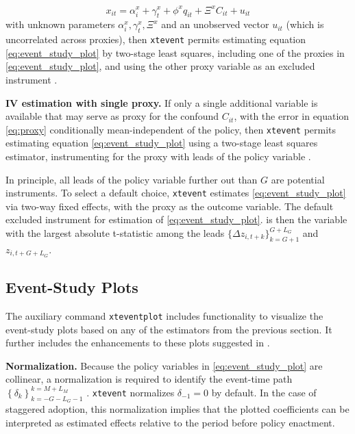 \documentclass[12pt]{article}
\begin{document}
\begin{equation}\label{eq:proxy}
x_{it} = \alpha_i^x + \gamma_t^x + \phi^x q_{it} + \Xi^x C_{it} + u_{it}
\end{equation}
with unknown parameters $\alpha_i^x, \gamma_t^x, \Xi^x$ and an unobserved vector $u_{it}$ (which is uncorrelated across proxies), then \texttt{xtevent} permits estimating equation \eqref{eq:event_study_plot} by two-stage least squares, including one of the proxies in \eqref{eq:event_study_plot}, and using the other proxy variable as an excluded instrument \label{newcite_proxy} \citep{freyaldenhoven2019pre}.

\noindent \textbf{IV estimation with single proxy.}
If only a single additional variable is available that may serve as proxy for the confound $C_{it}$, with the error in equation \eqref{eq:proxy} conditionally mean-independent of the policy, then \texttt{xtevent} permits estimating equation \eqref{eq:event_study_plot} using a two-stage least squares estimator, instrumenting for the proxy with leads of the policy variable \citep{freyaldenhoven2019pre}.

In principle, all leads of the policy variable further out than $G$ are potential instruments.
To select a default choice, \texttt{xtevent} estimates \eqref{eq:event_study_plot} via two-way fixed effects, with the proxy as the outcome variable.
The default excluded instrument for estimation of \eqref{eq:event_study_plot}. is then the variable with the largest absolute t-statistic among the leads $\{\Delta z_{i,t+k}\}_{k=G+1}^{G+L_G}$ and $z_{i,t+G+L_G}$.

\subsection{Event-Study Plots}
\label{subsec:plots}

The auxiliary command \texttt{xteventplot} includes functionality to visualize the event-study plots based on any of the estimators from the previous section.
It further includes the enhancements to these plots suggested in \cite{freyaldenhoven2021visualizationforth}.

\noindent \textbf{Normalization.}
\label{newcite_normalization}
Because the policy variables in \eqref{eq:event_study_plot} are collinear, a normalization is required to identify the event-time path $\left\{ \delta_k \right\}_{k = - G - L_G - 1}^{k = M + L_M}$ \citep{schmidheiny2023event, freyaldenhoven2021visualizationforth}.
\texttt{xtevent} normalizes $\delta_{-1}=0$ by default. In the case of staggered adoption, this normalization implies that the plotted coefficients can be interpreted as estimated effects relative to the period before policy enactment.
\end{document}
